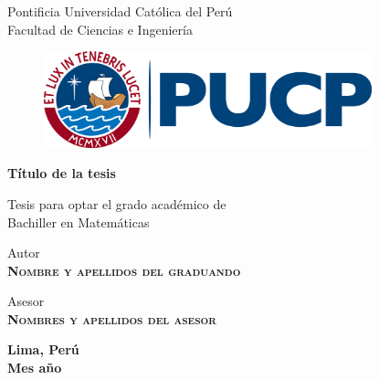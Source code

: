 \makeindex



\thispagestyle{empty}

\bigskip

\begin{center}
    {\baselineskip=30pt \Large Pontificia Universidad Cat\'olica del Per\'u} \\
    {\baselineskip=30pt \large Facultad de Ciencias e Ingenier\'ia}
    \bigskip
\end{center}

\begin{figure}[htb]
    \begin{center}
        \includegraphics[width=9.5cm]{images/2020-pucp-logo.png}
    \end{center}
\end{figure}

\begin{center}
    \begin{minipage}{14.0cm}
        \begin{center}
            \textcolor{pucp}
            {\textbf{\Huge{T\'itulo de la tesis}}}
        \end{center}
    \end{minipage}
\end{center}

\vspace*{2.00cm}

\begin{center}
    Tesis para optar el grado acad\'emico de \\
    Bachiller en Matem\'aticas
\end{center}

\vspace*{2.00cm}

\begin{center}
    Autor \\
    \textbf{\textsc{Nombre y apellidos del graduando}}
\end{center}

\vspace*{0.5cm}

\begin{center}
    Asesor \\
    \textbf{\textsc{Nombres y apellidos del asesor}}
\end{center}

\vspace*{1.00cm}

\begin{center}
    {
        \baselineskip=10pt
        \textbf{Lima, Per\'u} \\
        \textbf{Mes a\~no}
    }
\end{center}


